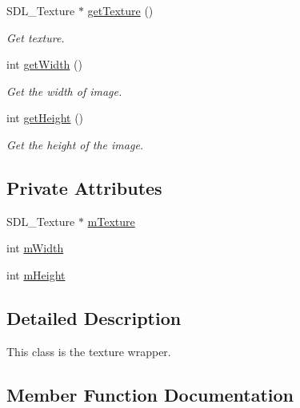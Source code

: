 \begin{DoxyCompactItemize}
S\+D\+L\+\_\+\+Texture $\ast$ \mbox{\hyperlink{class_l_texture_a4382db92d25291b8723e79922e801ba1}{get\+Texture}} ()
\begin{DoxyCompactList}\small\item\em Get texture. \end{DoxyCompactList}\item 
\mbox{\label{class_l_texture_a542c1f81d98fd5659a04eb394d61a879}} 
int \mbox{\hyperlink{class_l_texture_a542c1f81d98fd5659a04eb394d61a879}{get\+Width}} ()
\begin{DoxyCompactList}\small\item\em Get the width of image. \end{DoxyCompactList}\item 
\mbox{\label{class_l_texture_a277f45af3dae7e35ca846a527039e59a}} 
int \mbox{\hyperlink{class_l_texture_a277f45af3dae7e35ca846a527039e59a}{get\+Height}} ()
\begin{DoxyCompactList}\small\item\em Get the height of the image. \end{DoxyCompactList}\end{DoxyCompactItemize}
\subsection*{Private Attributes}
\begin{DoxyCompactItemize}
\item 
S\+D\+L\+\_\+\+Texture $\ast$ \mbox{\hyperlink{class_l_texture_a98d76cf42f620b9c2eacd7b71c3c0c2f}{m\+Texture}}
\item 
int \mbox{\hyperlink{class_l_texture_ac6b5edfd40c81b2b40b71b12e7da2b6f}{m\+Width}}
\item 
int \mbox{\hyperlink{class_l_texture_aea944f7b207bb9e8b57870d6bd3b5e05}{m\+Height}}
\end{DoxyCompactItemize}


\subsection{Detailed Description}
This class is the texture wrapper. 

\subsection{Member Function Documentation}
\mbox{\label{class_l_texture_a32f547476861cdc9ebfe86344b49c644}} 
